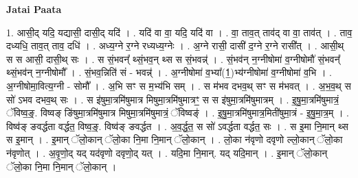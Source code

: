 \documentclass[17pt]{extarticle}
\begin{document}
\textbf{Jatai Paata} \newline

1. आसी॒द् यदि॒ यद्यासी॒ दासी॒द् यदि॑ । . यदि॑ वा वा॒ यदि॒ यदि॑ वा । . वा॒ ताव॒त् ताव॑द् वा वा॒ ताव॑त् । . ताव॒ दध्यधि॒ ताव॒त् ताव॒ दधि॑ । . अध्य॒ग्ने र॒ग्ने रध्यध्य॒ग्नेः । . अ॒ग्ने रासी॒ दासी॑ द॒ग्ने र॒ग्ने रासी᳚त् । . आसी॒थ् स स आसी॒ दासी॒थ् सः । . स सं॒भवन्᳚ थ्सं॒भव॒न् थ्स स सं॒भवन्न्॑ । . सं॒भव॑न् न॒ग्नीषोमा॑ व॒ग्नीषोमौ॑ सं॒भवन्᳚ थ्सं॒भव॑न् न॒ग्नीषोमौ᳚ । . सं॒भव॒न्निति॑ सं - भवन्न्॑ । . अ॒ग्नीषोमा॑ व॒भ्या᳚(1॒)भ्य॑ग्नीषोमा॑ व॒ग्नीषोमा॑ व॒भि । . अ॒ग्नीषोमा॒वित्य॒ग्नी - सोमौ᳚ । . अ॒भि सꣳ स म॒भ्य॑भि सम् । . स म॑भव दभव॒थ् सꣳ स म॑भवत् । . अ॒भ॒व॒थ् स सो॑ ऽभव दभव॒थ् सः । . स इ॑षुमा॒त्रमि॑षुमात्र मिषुमा॒त्रमि॑षुमात्रꣳ॒॒ स स इ॑षुमा॒त्रमि॑षुमात्रम् । . इ॒षु॒मा॒त्रमि॑षुमात्रं॒ ॅविष्व॒ङ्॒. विष्वङ् ङि॑षुमा॒त्रमि॑षुमात्र मिषुमा॒त्रमि॑षुमात्रं॒ ॅविष्वङ्॑ । . इ॒षु॒मा॒त्रमि॑षुमात्र॒मिती॑षुमा॒त्रं - इ॒षु॒मा॒त्र॒म् । . विष्व॑ङ् ङवर्द्धता वर्द्धत॒ विष्व॒ङ्॒. विष्व॑ङ् ङवर्द्धत । . अ॒व॒र्द्ध॒त॒ स सो॑ ऽवर्द्धता वर्द्धत॒ सः । . स इ॒मा नि॒मान् थ्स स इ॒मान् । . इ॒मान् ॅलो॒कान् ॅलो॒का नि॒मा नि॒मान् ॅलो॒कान् । . लो॒का न॑वृणो दवृणो ल्लो॒कान् ॅलो॒का न॑वृणोत् । . अ॒वृ॒णो॒द् यद् यद॑वृणो दवृणो॒द् यत् । . यदि॒मा नि॒मान्. यद् यदि॒मान् । . इ॒मान् ॅलो॒कान् ॅलो॒का नि॒मा नि॒मान् ॅलो॒कान् । \newline
\end{document}
